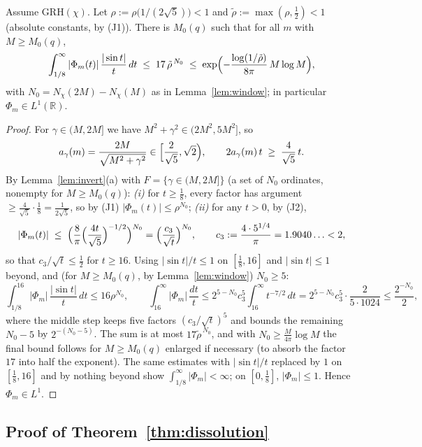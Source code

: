 \begin{lemma}\label{lem:bigt}
Assume GRH$(\chi)$. Let $\rho:=\rho\bigl(1/(2\sqrt5)\bigr)<1$ and
$\tilde\rho:=\max(\rho,\tfrac12)<1$ (absolute constants, by (J1)).
There is $M_0(q)$ such that for all $m$ with $M\ge M_0(q)$,
\[
\int_{1/8}^\infty|\Phi_m(t)|\,\frac{|\sin t|}{t}\,dt
\;\le\;17\,\tilde\rho^{\,N_0}
\;\le\;\exp\Bigl(-\frac{\log(1/\tilde\rho)}{8\pi}\,M\log M\Bigr),
\]
with $N_0=N_\chi(2M)-N_\chi(M)$ as in Lemma~\ref{lem:window};
in particular $\Phi_m\in L^1(\mathbb R)$.
\end{lemma}

\begin{proof}
For $\gamma\in(M,2M]$ we have $M^2+\gamma^2\in(2M^2,5M^2]$, so
\[
a_\gamma(m)=\frac{2M}{\sqrt{M^2+\gamma^2}}\in
\Bigl[\frac{2}{\sqrt5},\sqrt2\Bigr),
\qquad
2a_\gamma(m)\,t\;\ge\;\frac{4}{\sqrt5}\,t .
\]
By Lemma~\ref{lem:invert}(a) with $F=\{\gamma\in(M,2M]\}$ (a set of
$N_0$ ordinates, nonempty for $M\ge M_0(q)$):
\emph{(i)} for $t\ge\tfrac18$, every factor has argument
$\ge\tfrac{4}{\sqrt5}\cdot\tfrac18=\tfrac1{2\sqrt5}$, so by (J1)
$|\Phi_m(t)|\le\rho^{N_0}$;
\emph{(ii)} for any $t>0$, by (J2),
\[
|\Phi_m(t)|\;\le\;
\Bigl(\frac{8}{\pi}\Bigl(\frac{4t}{\sqrt5}\Bigr)^{-1/2}\Bigr)^{N_0}
=\Bigl(\frac{c_3}{\sqrt t}\Bigr)^{N_0},
\qquad
c_3:=\frac{4\cdot5^{1/4}}{\pi}=1.9040\ldots<2 ,
\]
so that $c_3/\sqrt t\le\tfrac12$ for $t\ge16$. Using
$|\sin t|/t\le1$ on $[\tfrac18,16]$ and $|\sin t|\le1$ beyond, and
(for $M\ge M_0(q)$, by Lemma~\ref{lem:window}) $N_0\ge5$:
\[
\int_{1/8}^{16}|\Phi_m|\,\frac{|\sin t|}t\,dt\le16\rho^{N_0},
\qquad
\int_{16}^\infty|\Phi_m|\,\frac{dt}t
\le2^{5-N_0}c_3^5\int_{16}^\infty t^{-7/2}\,dt
=2^{5-N_0}c_3^5\cdot\frac{2}{5\cdot1024}
\le\frac{2^{-N_0}}{2},
\]
where the middle step keeps five factors $(c_3/\sqrt t)^5$ and bounds
the remaining $N_0-5$ by $2^{-(N_0-5)}$. The sum is at most
$17\tilde\rho^{\,N_0}$, and with
$N_0\ge\tfrac{M}{4\pi}\log M$ the final bound follows for
$M\ge M_0(q)$ enlarged if necessary (to absorb the factor $17$ into
half the exponent). The same estimates with $|\sin t|/t$ replaced by
$1$ on $[\tfrac18,16]$ and by nothing beyond show
$\int_{1/8}^\infty|\Phi_m|<\infty$; on $[0,\tfrac18]$, $|\Phi_m|\le1$.
Hence $\Phi_m\in L^1$.
\end{proof}

\subsection*{Proof of Theorem~\ref{thm:dissolution}}


